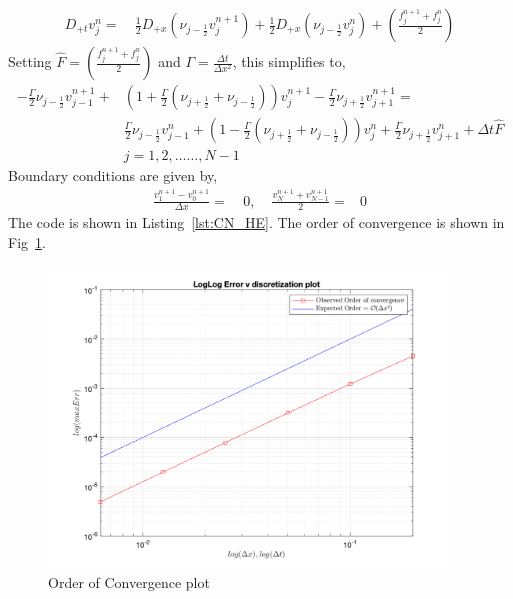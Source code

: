 \documentclass[11pt]{article}
\newcommand{\Dpt}{D_{+t}}
\newcommand{\Dpx}{D_{+x}}
\newcommand{\dx}{\Delta x}
\newcommand{\dt}{\Delta t}
\newcommand{\bra}[1]{\left(#1\right)}
\newcommand{\vnj}{v^n_j}
\newcommand{\vnpjm}{v^{n+1}_{j-1}}
\newcommand{\vnpjp}{v^{n+1}_{j+1}}
\newcommand{\vnpj}{v^{n+1}_{j}}
\newcommand{\vnjm}{v^{n}_{j-1}}
\newcommand{\vnjp}{v^{n}_{j+1}}
\newcommand{\njmh}{\nu_{j-\frac{1}{2}}}
\newcommand{\njph}{\nu_{j+\frac{1}{2}}}
\begin{document}
\begin{enumerate}
\begin{enumerate}
\begin{align*}
        \Dpt \vnj =& \ \frac{1}{2}\Dpx\bra{\njmh\vnpj} + \frac{1}{2}\Dpx\bra{\njmh\vnj} + \bra{\frac{f^{n+1}_j+f^n_j}{2}}
    \end{align*}
    Setting $\hat{F} = \bra{\frac{f^{n+1}_j+f^n_j}{2}}$ and $\Gamma = \frac{\dt}{\dx^2}$, this simplifies to,
    \begin{align*}
        -\frac{\Gamma}{2}\njmh\vnpjm +& \bra{1+\frac{\Gamma}{2}\bra{\njph+\njmh}}\vnpj -\frac{\Gamma}{2}\njph\vnpjp = \\
        & \frac{\Gamma}{2}\njmh\vnjm + \bra{1-\frac{\Gamma}{2}\bra{\njph+\njmh}}\vnj + \frac{\Gamma}{2}\njph \vnjp + \dt \hat{F} \\
        & j=1,2,\ldots \ldots, N-1
    \end{align*}
    Boundary conditions are given by,
    \begin{align*}
        \frac{v^{n+1}_{1} - v^{n+1}_{0}}{\dx} =& \ 0, \; & \frac{v^{n+1}_{N}+v^{n+1}_{N-1}}{2} =& 0 
    \end{align*}
    The code is shown in Listing~\ref{lst:CN_HE}. The order of convergence is shown in Fig~\ref{fig:convergence_q1}.
    
    \begin{figure}[htp]
        \centering
        \includegraphics[width=4.2in]{ErrPlotQ1.png}
        \caption{Order of Convergence plot}
        \label{fig:convergence_q1}
    \end{figure}
  \end{enumerate}
  

\end{enumerate}
\end{document}
